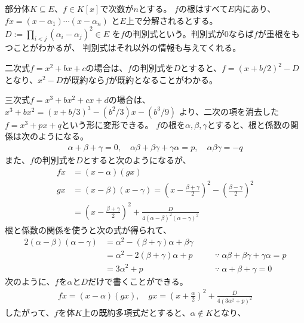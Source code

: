 {	部分体$K\subseteq E$、$f\in K[x]$で次数が$n$とする。
	$f$の根はすべて$E$内にあり、$fx=(x-\alpha_1)\cdots(x-\alpha_n)$
	と$E$上で分解されるとする。$D:=\prod_{i<j}(\alpha_i-\alpha_j)^2\in E$
	を$f$の判別式という。判別式が$0$ならば$f$が重根をもつことがわかるが、
	判別式はそれ以外の情報も与えてくれる。

	二次式$f=x^2+bx+c$の場合は、$f$の判別式を$D$とすると、$f=(x+b/2)^2-D$
	となり、$x^2-D$が既約なら$f$が既約となることがわかる。

	三次式$f=x^3+bx^2+cx+d$の場合は、$x^3+bx^2=(x+b/3)^3-(b^2/3)x-(b^3/9)$
	より、二次の項を消去した$f=x^3+px+q$という形に変形できる。
	$f$の根を$\alpha,\beta,\gamma$とすると、根と係数の関係は次のようになる。
	\begin{equation*}\begin{split}
		\alpha + \beta + \gamma = 0,\quad
		\alpha\beta + \beta\gamma + \gamma\alpha = p,\quad
		\alpha\beta\gamma = -q
	\end{split}\end{equation*}
	また、$f$の判別式を$D$とすると次のようになるが、
	\begin{equation*}\begin{split}
		fx &= (x-\alpha)(gx) \\
		gx &= (x-\beta)(x-\gamma) 
			= \left(x - \frac{\beta + \gamma}{2}\right)^2 
				- \left(\frac{\beta - \gamma}{2}\right)^2 \\
			&= \left(x - \frac{\beta + \gamma}{2}\right)^2
				+ \frac{D}{4(\alpha-\beta)^2(\alpha-\gamma)^2}
	\end{split}\end{equation*}
	根と係数の関係を使うと次の式が得られて、
	\begin{alignat*}{2}
		(\alpha-\beta)(\alpha-\gamma)
		&= \alpha^2 - (\beta + \gamma)\alpha + \beta\gamma \\
		&= \alpha^2 - 2(\beta + \gamma)\alpha + p 
		&\quad&\because\; \alpha\beta + \beta\gamma + \gamma\alpha = p \\
		&= 3\alpha^2 + p
		&\quad&\because\; \alpha + \beta + \gamma = 0
	\end{alignat*}
	次のように、$f$を$\alpha$と$D$だけで書くことができる。
	\begin{equation*}\begin{split}
		fx = (x - \alpha)(gx),\quad
		gx = \left(x + \frac{\alpha}{2}\right)^2 
			+ \frac{D}{4(3\alpha^2 + p)^2}
	\end{split}\end{equation*}
	したがって、$f$を体$K$上の既約多項式だとすると、$\alpha\not\in K$となり、
}
